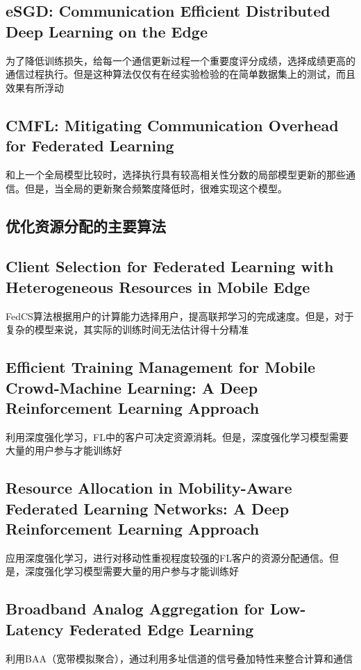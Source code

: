\documentclass[12pt, a4paper]{article}
\begin{document}
        \subsection*{eSGD: Communication Efficient Distributed Deep Learning on the Edge\cite{216799}}
            为了降低训练损失，给每一个通信更新过程一个重要度评分成绩，选择成绩更高的通信过程执行。但是这种算法仅仅有在经实验检验的在简单数据集上的测试，而且效果有所浮动        
        \subsection*{CMFL: Mitigating Communication Overhead for Federated Learning\cite{8885054}}
            和上一个全局模型比较时，选择执行具有较高相关性分数的局部模型更新的那些通信。但是，当全局的更新聚合频繁度降低时，很难实现这个模型。

    \subsection*{优化资源分配的主要算法}
        \subsection*{Client Selection for Federated Learning with Heterogeneous Resources in Mobile Edge\cite{216799}}
            FedCS算法根据用户的计算能力选择用户，提高联邦学习的完成速度。但是，对于复杂的模型来说，其实际的训练时间无法估计得十分精准        
        \subsection*{Efficient Training Management for Mobile Crowd-Machine Learning: A Deep Reinforcement Learning Approach\cite{8716527}}
            利用深度强化学习，FL中的客户可决定资源消耗。但是，深度强化学习模型需要大量的用户参与才能训练好        
        \subsection*{Resource Allocation in Mobility-Aware Federated Learning Networks: A Deep Reinforcement Learning Approach\cite{nguyen2019resource}}
            应用深度强化学习，进行对移动性重视程度较强的FL客户的资源分配通信。但是，深度强化学习模型需要大量的用户参与才能训练好
        \subsection*{Broadband Analog Aggregation for Low-Latency Federated Edge Learning\cite{8870236}}
            利用BAA（宽带模拟聚合），通过利用多址信道的信号叠加特性来整合计算和通信
\end{document}
